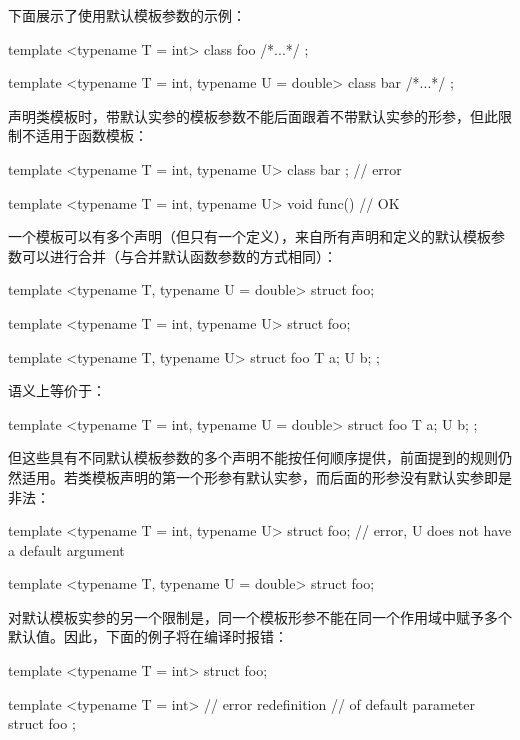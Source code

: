 下面展示了使用默认模板参数的示例：

\begin{cpp}
template <typename T = int>
class foo { /*...*/ };

template <typename T = int, typename U = double>
class bar { /*...*/ };
\end{cpp}

声明类模板时，带默认实参的模板参数不能后面跟着不带默认实参的形参，但此限制不适用于函数模板：

\begin{cpp}
template <typename T = int, typename U>
class bar { }; // error

template <typename T = int, typename U>
void func() {} // OK
\end{cpp}

一个模板可以有多个声明（但只有一个定义），来自所有声明和定义的默认模板参数可以进行合并（与合并默认函数参数的方式相同）：

\begin{cpp}
template <typename T, typename U = double>
struct foo;

template <typename T = int, typename U>
struct foo;

template <typename T, typename U>
struct foo
{
	T a;
	U b;
};
\end{cpp}

语义上等价于：

\begin{cpp}
template <typename T = int, typename U = double>
struct foo
{
	T a;
	U b;
};
\end{cpp}

但这些具有不同默认模板参数的多个声明不能按任何顺序提供，前面提到的规则仍然适用。若类模板声明的第一个形参有默认实参，而后面的形参没有默认实参即是非法：

\begin{cpp}
template <typename T = int, typename U>
struct foo; // error, U does not have a default argument

template <typename T, typename U = double>
struct foo;
\end{cpp}

对默认模板实参的另一个限制是，同一个模板形参不能在同一个作用域中赋予多个默认值。因此，下面的例子将在编译时报错：

\begin{cpp}
template <typename T = int>
struct foo;

template <typename T = int> // error redefinition
                            // of default parameter
struct foo {};
\end{cpp}

